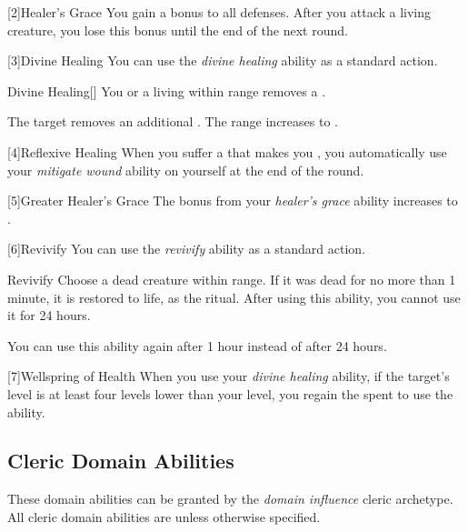         [2]{Healer's Grace} You gain a  bonus to all defenses.
        After you attack a living creature, you lose this bonus until the end of the next round.

        [3]{Divine Healing} You can use the \textit{divine healing} ability as a standard action.
        \begin{apability}{Divine Healing}[]
            You or a living  within \rngclose range removes a .

            \rankline
             The target removes an additional .
             The range increases to \rnglong.
        \end{apability}

        [4]{Reflexive Healing} When you suffer a  that makes you , you automatically use your \textit{mitigate wound} ability on yourself at the end of the round.

        [5]{Greater Healer's Grace} The bonus from your \textit{healer's grace} ability increases to .

        [6]{Revivify} You can use the \textit{revivify} ability as a standard action.
        \begin{apability}{Revivify}
            Choose a dead creature within \rngclose range.
            If it was dead for no more than 1 minute, it is restored to life, as the  ritual.
            After using this ability, you cannot use it for 24 hours.

            \rankline
             You can use this ability again after 1 hour instead of after 24 hours.
        \end{apability}

        [7]{Wellspring of Health} When you use your \textit{divine healing} ability,
            if the target's level is at least four levels lower than your level,
            you regain the  spent to use the ability.

    \subsection{Cleric Domain Abilities}\label{Cleric Domain Abilities}
        These domain abilities can be granted by the \textit{domain influence} cleric archetype.
        All cleric domain abilities are  unless otherwise specified.

